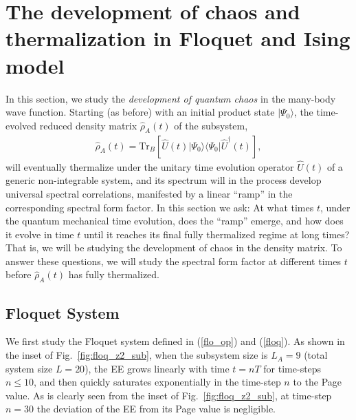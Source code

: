\documentclass[aps,prb,preprint,onecolumn,amsmath,amssymb,superscriptaddress,eqsecnum,floatfix,scrartcl]{revtex4-1}
\begin{document}
\section{The 
development of chaos and thermalization
 in Floquet and Ising model}
\label{onset_chaos}
In this section, we study the 
{\it development of quantum chaos }
in  the many-body wave function. Starting (as before) with an initial product state $|\Psi_0\rangle$, 
the time-evolved  reduced density matrix 
${\hat \rho}_A(t)$
of 
the subsystem,
\begin{align}
{\hat \rho}_A(t)=\mbox{Tr}_B \left[{\hat U}(t)|\Psi_0\rangle\langle \Psi_0|{\hat U}^{\dag}(t)\right],
\end{align}
will eventually thermalize
under the unitary time evolution 
operator ${\hat U}(t)$ of a 
generic non-integrable system, 
 and
its spectrum will in the process
 develop universal spectral correlations,
manifested by
a linear   ``ramp'' in the corresponding spectral form factor. 
In this section we ask: At what times $t$, under the quantum mechanical time evolution, does the ``ramp'' 
emerge, and how does it evolve in time $t$ until
it reaches its final fully thermalized regime  at long times?
That is, we will
be studying the 
development of chaos
 in the density matrix.
To answer these questions, we will study the spectral form factor at different  times $t$ before 
${\hat \rho}_A(t)$ has
fully thermalized. 

\subsection{Floquet System}
We first study the
Floquet system defined in 
(\ref{flo_op}) and (\ref{floq}).\cite{Kim_Huse_2014, DAlessio2014,Lazarides2014,PONTE2015,Zhang2015}
 As shown in the inset of Fig.~\ref{fig:floq_z2_sub}, when the subsystem size is $L_A=9$ (total system size $L=20$), the EE grows linearly with time 
$t=n T$
for time-steps  $n\leq 10$, and then 
quickly  saturates exponentially in the  time-step $n$  to the Page value. 
As is clearly seen from
the inset  of Fig.~\ref{fig:floq_z2_sub},
at time-step $n=30$  the 
deviation of the EE from its Page value is  negligible.
\end{document}
